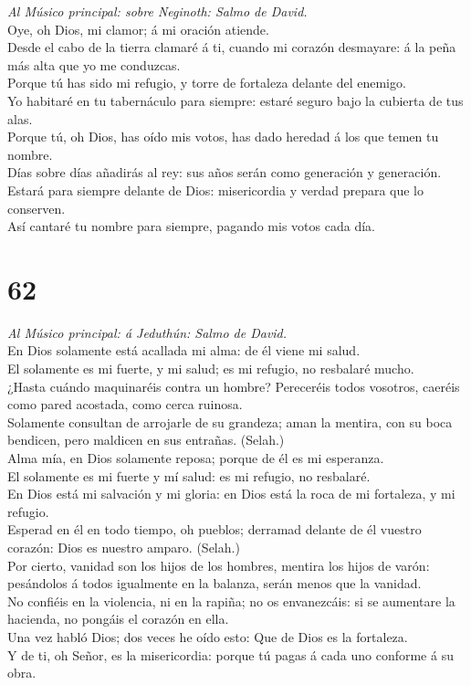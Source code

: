  \emph{Al Músico principal: sobre Neginoth: Salmo de
David.}\\
Oye, oh Dios, mi clamor; á mi oración atiende.\\
 Desde el cabo de la tierra clamaré á ti, cuando mi corazón
desmayare: á la peña más alta que yo me conduzcas.\\
 Porque tú has sido mi refugio, y torre de fortaleza delante
del enemigo.\\
 Yo habitaré en tu tabernáculo para siempre: estaré seguro
bajo la cubierta de tus alas.\\
 Porque tú, oh Dios, has oído mis votos, has dado heredad á
los que temen tu nombre.\\
 Días sobre días añadirás al rey: sus años serán como
generación y generación.\\
 Estará para siempre delante de Dios: misericordia y verdad
prepara que lo conserven.\\
 Así cantaré tu nombre para siempre, pagando mis votos cada
día.

\hypertarget{section-61}{%
\section{62}\label{section-61}}

 \emph{Al Músico principal: á Jeduthún: Salmo de David.}\\
En Dios solamente está acallada mi alma: de él viene mi salud.\\
 El solamente es mi fuerte, y mi salud; es mi refugio, no
resbalaré mucho.\\
 ¿Hasta cuándo maquinaréis contra un hombre? Pereceréis
todos vosotros, caeréis como pared acostada, como cerca ruinosa.\\
 Solamente consultan de arrojarle de su grandeza; aman la
mentira, con su boca bendicen, pero maldicen en sus entrañas. (Selah.)\\
 Alma mía, en Dios solamente reposa; porque de él es mi
esperanza.\\
 El solamente es mi fuerte y mí salud: es mi refugio, no
resbalaré.\\
 En Dios está mi salvación y mi gloria: en Dios está la roca
de mi fortaleza, y mi refugio.\\
 Esperad en él en todo tiempo, oh pueblos; derramad delante
de él vuestro corazón: Dios es nuestro amparo. (Selah.)\\
 Por cierto, vanidad son los hijos de los hombres, mentira
los hijos de varón: pesándolos á todos igualmente en la balanza, serán
menos que la vanidad.\\
 No confiéis en la violencia, ni en la rapiña; no os
envanezcáis: si se aumentare la hacienda, no pongáis el corazón en
ella.\\
 Una vez habló Dios; dos veces he oído esto: Que de Dios es
la fortaleza.\\
 Y de ti, oh Señor, es la misericordia: porque tú pagas á
cada uno conforme á su obra.

